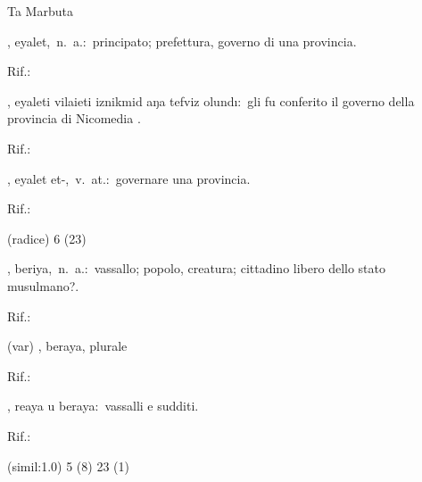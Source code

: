 \begin{glossario}{Ta Marbuta}
\item[{\color{colorlowref}\spzrl{ayAlat}},] {\sf eyalet},\ n.\ a.:\ principato; prefettura, governo di una provincia.
\begin{subvocedue}
\item[Rif.:] 
\end{subvocedue}
\begin{subvocedue}
\item[\subglossariobullet] , {\sf eyaleti vilaieti iznikmid aŋa tefviz olundı}:\ gli fu conferito il governo della provincia di Nicomedia \verificare[trascrizione].
\begin{subvocedue}
\item[Rif.:] 
\end{subvocedue}
\item[\subglossariobullet] , {\sf eyalet et-},\ v.\ at.:\ governare una provincia.
\begin{subvocedue}
\item[Rif.:] 
\end{subvocedue}
\item[(radice)]   6 (23)
\end{subvocedue}
\item[{\color{colorlowref}\spzrl{barIyaT}},] {\sf beriya},\ n.\ a.:\ vassallo; popolo, creatura; cittadino libero dello stato musulmano?.
\begin{subvocedue}
\item[Rif.:] 
\end{subvocedue}
\begin{subvocedue}
\item[(var)] , {\sf beraya}, plurale\begin{subvocedue}
\item[Rif.:] 
\end{subvocedue}
\item[\subglossariobullet] , {\sf reaya u beraya}:\ vassalli e sudditi.
\begin{subvocedue}
\item[Rif.:] 
\end{subvocedue}
\item[(simil:1.0)]   5 (8) 23 (1)
\end{subvocedue}



\end{glossario}
